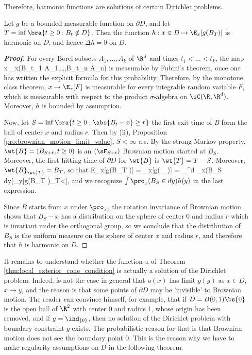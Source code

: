 Therefore, harmonic functions are solutions of certain Dirichlet problems.

\begin{proposition}
Let $g$ be a bounded measurable function on $\partial D$, and let $T = \inf\bra{t \geq 0: B_t \notin D}$. Then the function $h: x \in D \mapsto \E_x[g(B_T )]$ is harmonic on $D$, and hence $\Delta h = 0$ on $D$.
\end{proposition}

\begin{proof}[\bf Proof]
For every Borel subsets $A_1,\dots,A_k$ of $\R^d$ and times $t_1 <\dots< t_k$, the map
\be
x \mapsto \pro_x(B_{t_1} \in A_1,\dots,B_{t_n} \in A_n)
\ee
is measurable by Fubini's theorem, once one has written the explicit formula for this probability. Therefore, by the monotone class theorem, $x \to \E_x[F]$ is measurable for every integrable random variable $F$, which is measurable with respect to the product $\sigma$-algebra on $\sC(\R,\R^d)$. Moreover, $h$ is bounded by assumption.

Now, let $S = \inf\bra{t \geq 0:\abs{B_t - x} \geq r}$ the first exit time of $B$ form the ball of center $x$ and radius $r$. Then by (ii), Proposition \ref{pro:brownian_motion_limit_value}, $S < \infty$ a.s. By the strong Markov property, $\wt{B} = (B_{S+t}, t \geq 0)$ is an $(\sF_{S+t})$ Brownian motion started at $B_S$. Moreover, the first hitting time of $\partial D$ for $\wt{B}$ is $\wt{T} = T - S$. Moreover, $\wt{B}_{\wt{T}} = B_T$, so that 
\be
E_x[g(B_T )] = \E_x[g( _{})] = \int_{\R^d} \pro_x(B_S \in dy)\E_y[g(B_T )\ind_{T<\infty}],
\ee
and we recognize $\int \pro_x(B_S \in dy)h(y)$ in the last expression.

Since $B$ starts from $x$ under $\pro_x$, the rotation invariance of Brownian motion shows that $B_S -x$ has a distribution on the sphere of center 0 and radius $r$ which is invariant under the orthogonal group, so we conclude that the distribution of $B_S$ is the uniform measure on the sphere of center $x$ and radius $r$, and therefore that $h$ is harmonic on $D$.
\end{proof}

It remains to understand whether the function u of Theorem \ref{thm:local_exterior_cone_condition} is actually a solution of the Dirichlet problem. Indeed, is not the case in general that $u(x)$ has limit $g(y)$ as $x \in D$, $x \to y$, and the reason is that some points of $\partial D$ may be 'invisible' to Brownian motion. The reader can convince himself, for example, that if $D = B(0, 1) \bs \{0\}$ is the open ball of $\R^2$ with center 0 and radius 1, whose origin has been removed, and if $g = \ind_{\{0\}}$, then no solution of the Dirichlet problem with boundary constraint $g$ exists. The probabilistic reason
for that is that Brownian motion does not see the boundary point 0. This is the reason why we have to make regularity assumptions on $D$ in the following theorem. 

